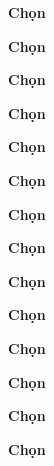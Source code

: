 \protect {}
\begin{loigiaiex}{1}
  \phantom {a}\hfill {\bfseries \sffamily Chọn~} 
\end{loigiaiex}
\begin{loigiaiex}{2}
  \phantom {a}\hfill {\bfseries \sffamily Chọn~} 
\end{loigiaiex}
\begin{loigiaiex}{3}
  \phantom {a}\hfill {\bfseries \sffamily Chọn~} 
\end{loigiaiex}
\begin{loigiaiex}{4}
  \phantom {a}\hfill {\bfseries \sffamily Chọn~} 
\end{loigiaiex}
\begin{loigiaiex}{5}
  \phantom {a}\hfill {\bfseries \sffamily Chọn~} 
\end{loigiaiex}
\begin{loigiaiex}{6}
  \phantom {a}\hfill {\bfseries \sffamily Chọn~} 
\end{loigiaiex}
\begin{loigiaiex}{7}
  \phantom {a}\hfill {\bfseries \sffamily Chọn~} 
\end{loigiaiex}
\begin{loigiaiex}{8}
  \phantom {a}\hfill {\bfseries \sffamily Chọn~} 
\end{loigiaiex}
\begin{loigiaiex}{9}
  \phantom {a}\hfill {\bfseries \sffamily Chọn~} 
\end{loigiaiex}
\begin{loigiaiex}{10}
  \phantom {a}\hfill {\bfseries \sffamily Chọn~} 
\end{loigiaiex}
\begin{loigiaiex}{11}
  \phantom {a}\hfill {\bfseries \sffamily Chọn~} 
\end{loigiaiex}
\begin{loigiaiex}{12}
  \phantom {a}\hfill {\bfseries \sffamily Chọn~} 
\end{loigiaiex}
\begin{loigiaiex}{13}
  \phantom {a}\hfill {\bfseries \sffamily Chọn~} 
\end{loigiaiex}
\begin{loigiaiex}{14}
  \phantom {a}\hfill {\bfseries \sffamily Chọn~} 
\end{loigiaiex}
